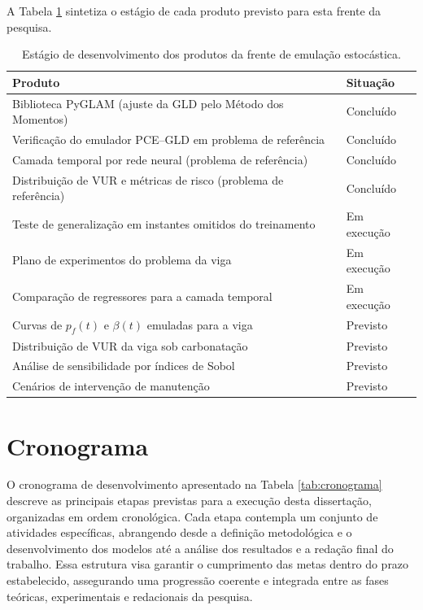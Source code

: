 A Tabela \ref{tab:estado_desenvolvimento} sintetiza o estágio de cada produto previsto para esta frente da pesquisa.

\begin{table}[H]
\centering
\footnotesize
\caption{Estágio de desenvolvimento dos produtos da frente de emulação estocástica.}
\label{tab:estado_desenvolvimento}
\begin{tabularx}{\textwidth}{X l}
\toprule
\textbf{Produto} & \textbf{Situação} \\
\midrule
Biblioteca PyGLAM (ajuste da GLD pelo Método dos Momentos)      & Concluído \\
Verificação do emulador PCE--GLD em problema de referência       & Concluído \\
Camada temporal por rede neural (problema de referência)          & Concluído \\
Distribuição de VUR e métricas de risco (problema de referência)  & Concluído \\
Teste de generalização em instantes omitidos do treinamento       & Em execução \\
Plano de experimentos do problema da viga                         & Em execução \\
Comparação de regressores para a camada temporal                  & Em execução \\
Curvas de $p_f(t)$ e $\beta(t)$ emuladas para a viga              & Previsto \\
Distribuição de VUR da viga sob carbonatação                      & Previsto \\
Análise de sensibilidade por índices de Sobol                     & Previsto \\
Cenários de intervenção de manutenção                             & Previsto \\
\bottomrule
\end{tabularx}
\vspace{0.2cm}
\end{table}

\section{Cronograma}

O cronograma de desenvolvimento apresentado na Tabela \ref{tab:cronograma} descreve as principais etapas previstas para a execução desta dissertação, organizadas em ordem cronológica. Cada etapa contempla um conjunto de atividades específicas, abrangendo desde a definição metodológica e o desenvolvimento dos modelos até a análise dos resultados e a redação final do trabalho. Essa estrutura visa garantir o cumprimento das metas dentro do prazo estabelecido, assegurando uma progressão coerente e integrada entre as fases teóricas, experimentais e redacionais da pesquisa.


